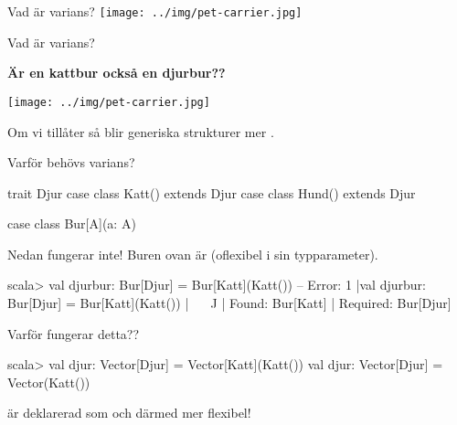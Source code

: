 
\ifkompendium\else
\begin{SlideSimple}{Vad är varians?}
\hspace*{-2cm}\texttt{[image: ../img/pet-carrier.jpg]}  
\end{SlideSimple}
\fi 

\begin{Slide}{Vad är varians?}
\begin{center}
\textbf{Är en kattbur också en djurbur??}

\texttt{[image: ../img/pet-carrier.jpg]}  

Om vi tillåter  så blir generiska strukturer mer .
\end{center}
\end{Slide}

\begin{Slide}{Varför behövs varians?}\SlideFontSmall
\begin{Code}
trait Djur
case class Katt() extends Djur
case class Hund() extends Djur

case class Bur[A](a: A)
\end{Code}
\pause
Nedan fungerar inte! Buren ovan är  (oflexibel i sin typparameter).
\begin{REPL}
scala> val djurbur: Bur[Djur] = Bur[Katt](Katt())
-- Error:
1 |val djurbur: Bur[Djur] = Bur[Katt](Katt())
  |                   ^^^^^^^^^^^^^^^^^
  |                   Found:    Bur[Katt]
  |                   Required: Bur[Djur]
\end{REPL}
\pause
Varför fungerar detta??
\begin{REPL}
scala> val djur: Vector[Djur] = Vector[Katt](Katt())
val djur: Vector[Djur] = Vector(Katt())
\end{REPL}
\pause {} är deklarerad som  och därmed mer flexibel!
\end{Slide}


